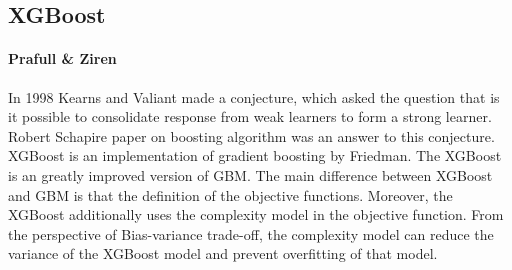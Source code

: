 \documentclass[runningheads]{llncs}
\begin{document}
\subsection{XGBoost}
\paragraph{Prafull & Ziren }In 1998 Kearns and Valiant made a conjecture, which asked the question that is it possible to consolidate response from weak learners to form a strong learner. Robert Schapire paper on boosting algorithm was an answer to this conjecture. XGBoost is an implementation of gradient boosting by Friedman. The XGBoost is an greatly improved version of GBM. The main difference between XGBoost and GBM is that the definition of the objective functions. Moreover, the XGBoost additionally uses the complexity model in the objective function. From the perspective of Bias-variance trade-off, the complexity model can reduce the variance of the XGBoost model and prevent overfitting of that model.

\end{document}
